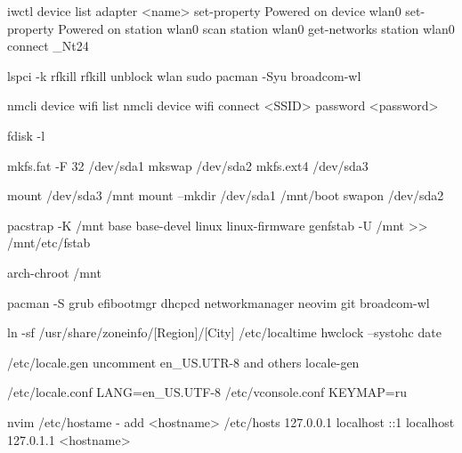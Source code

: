 iwctl
device list
adapter <name> set-property Powered on
device wlan0 set-property Powered on
station wlan0 scan
station wlan0 get-networks
station wlan0 connect _Nt24

lspci -k
rfkill
rfkill unblock wlan
sudo pacman -Syu broadcom-wl

nmcli device wifi list
nmcli device wifi connect <SSID> password <password>

fdisk -l

mkfs.fat -F 32 /dev/sda1
mkswap /dev/sda2
mkfs.ext4 /dev/sda3

mount /dev/sda3 /mnt
mount --mkdir /dev/sda1 /mnt/boot
swapon /dev/sda2

pacstrap -K /mnt base base-devel linux linux-firmware
genfstab -U /mnt >> /mnt/etc/fstab


arch-chroot /mnt

pacman -S 
    grub
    efibootmgr
    dhcpcd
    networkmanager
    neovim
    git
    broadcom-wl %


ln -sf /usr/share/zoneinfo/[Region]/[City] /etc/localtime
hwclock --systohc
date


/etc/locale.gen uncomment en_US.UTR-8 and others
locale-gen

/etc/locale.conf
LANG=en_US.UTF-8
/etc/vconsole.conf
KEYMAP=ru


nvim /etc/hostame - add <hostname>
/etc/hosts
127.0.0.1 localhost
::1       localhost
127.0.1.1 <hostname>


